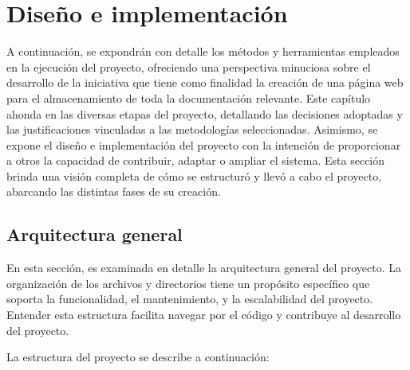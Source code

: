\documentclass[a4paper, 12pt]{book}
\begin{document}
\cleardoublepage
\chapter{Diseño e implementación}
\label{sec:diseno}

A continuación, se expondrán con detalle los métodos y herramientas empleados en la ejecución del proyecto, ofreciendo una perspectiva minuciosa sobre el desarrollo 
de la iniciativa que tiene como finalidad la creación de una página web para el almacenamiento de toda la documentación relevante. Este capítulo ahonda en las diversas 
etapas del proyecto, detallando las decisiones adoptadas y las justificaciones vinculadas a las metodologías seleccionadas. 
Asimismo, se expone el diseño e implementación del proyecto con la intención de proporcionar a otros la capacidad de contribuir, adaptar o ampliar el sistema. 
Esta sección brinda una visión completa de cómo se estructuró y llevó a cabo el proyecto, abarcando las distintas fases de su creación.


\section{Arquitectura general} 
\label{sec:arquitectura}

En esta sección, es examinada en detalle la arquitectura general del proyecto. La organización de los archivos y directorios tiene un propósito específico que soporta 
la funcionalidad, el mantenimiento, y la escalabilidad del proyecto. Entender esta estructura facilita navegar por el código y contribuye al desarrollo del proyecto.

La estructura del proyecto se describe a continuación:
\end{document}
